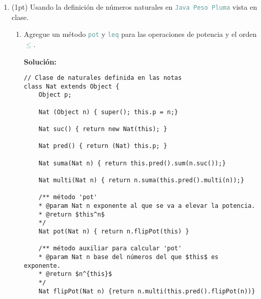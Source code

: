 \documentclass{article}
\newcommand{\tp}[1]{\textcolor{CadetBlue} {\texttt{#1}}}
\newcommand{\tb}[1]{\textcolor{RoyalPurple} {\textbf{#1}}}
\newcommand{\pt}[1]{\textcolor{RoyalPurple}{(#1pt)}}
\begin{document}
\begin{enumerate}
\begin{itemize}
            Es decir, la igualdad ya no es transitiva, lo cuál es chocante
            porque ya no sería una relación de equivalencia.

            \item \tp{Int $\leq$ String} y \tp{+} sobrecargado

            Considere

            \begin{verbatim}
(1+2)+"a" = "3a"
1+(2+"a") = "12a"
            \end{verbatim}

            Es es que \tp{+} ya no sería asociativa, lo cuál sí cumpliría si
            \tp{Int $\not \leq$ String}.

            Fuera de este inconveniente, todo respecto a los tipos se mantiene
            en regla.

            \item \tp{Int $\leq$ String} y \tp{=} sobrecargado
            \item \tp{+} y \tp{=} sobrecargados
        \end{itemize}

        \item \pt{1} Usando la definición de números naturales en
        \tp{Java Peso Pluma} vista en clase.

        \begin{enumerate}
            \item Agregue un método \tp{pot} y \tp{leq} para las operaciones de
            potencia y el orden \tp{$\leq$}.

            \tb{Solución:}

            \begin{verbatim}
// Clase de naturales definida en las notas
class Nat extends Object {
    Object p;

    Nat (Object n) { super(); this.p = n;}

    Nat suc() { return new Nat(this); }

    Nat pred() { return (Nat) this.p; }

    Nat suma(Nat n) { return this.pred().sum(n.suc());}

    Nat multi(Nat n) { return n.suma(this.pred().multi(n));}

    /** método 'pot'
    * @param Nat n exponente al que se va a elevar la potencia.
    * @return $this^n$
    */
    Nat pot(Nat n) { return n.flipPot(this) }

    /** método auxiliar para calcular 'pot'
    * @param Nat n base del números del que $this$ es exponente.
    * @return $n^{this}$
    */
    Nat flipPot(Nat n) {return n.multi(this.pred().flipPot(n))}


\end{verbatim}
\end{enumerate}
\end{enumerate}
\end{document}
